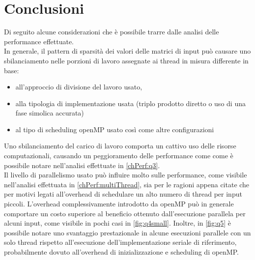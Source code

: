 \section{Conclusioni}
Di seguito alcune considerazioni che è possibile trarre dalle analisi delle performance effettuate.\\
In generale, il pattern di sparsità dei valori \nnz delle matrici di input può causare uno sbilanciamento
nelle porzioni di lavoro assegnate ai thread in misura differente in base:
\begin{itemize}
	\item	all'approccio di divisione del lavoro usato,
	\item	alla tipologia di implementazione usata (triplo prodotto diretto o uso di una fase simolica accurata)
	\item	al tipo di scheduling openMP usato così come altre configurazioni
\end{itemize}
Uno sbilanciamento del carico di lavoro comporta un cattivo uso delle risorse computazionali, causando un peggioramento delle performance 
come come è possibile notare nell'analisi effettuate in \ref{chPerf:q3}.\\
\voidLine
Il livello di parallelismo usato può influire molto sulle performance, come visibile nell'analisi effettuata in \ref{chPerf:multiThread},
sia per le ragioni appena citate che per motivi legati all'overhead di schedulare un alto numero di thread
per input piccoli.
\voidLine
L'overhead complessivamente introdotto da openMP può in generale comportare un costo superiore al beneficio
ottenuto dall'esecuzione parallela per alcuni input, come visibile in pochi casi in \ref{fig:q4small}.
Inoltre, in \ref{fig:q5} è possibile notare uno svantaggio prestazionale in alcune esecuzioni parallele con un solo thread
rispetto all'esecuzione dell'implementazione seriale di riferimento, 
probabilmente dovuto all'overhead di inizializzazione e scheduling di openMP.\\

